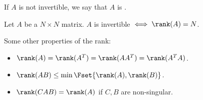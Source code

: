 \documentclass{article}
\begin{document}
\begin{definition}
  If $A$ is not invertible, we say that $A$ is .
\end{definition}

\begin{theorem}
  Let $A$ be a $N \times N$ matrix. $A$ is invertible $\iff \rank(A) = N$.
\end{theorem}

Some other properties of the rank:
\begin{itemize}[label=$\bullet$]
  \item $\rank(A) = \rank(A^T) = \rank(A A^T) = \rank(A^T A)$.
  \item $\rank(AB) \le \min\Fset{\rank(A), \rank(B)}$.
  \item $\rank(CAB) = \rank(A)$ if $C, B$ are non-singular.
\end{itemize}
\end{document}
